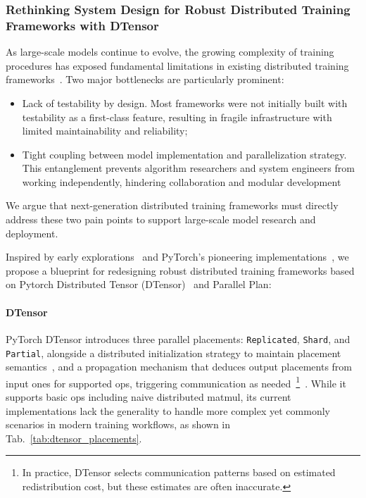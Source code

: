 
\subsubsection{Rethinking System Design for Robust Distributed Training Frameworks with DTensor}\label{sec:train_infra_odin}

As large-scale models continue to evolve, the growing  complexity of training procedures has exposed fundamental limitations in existing distributed training frameworks~\citep{shoeybi2020megatronlm, rajbhandari2020zeromemoryoptimizationstraining}. Two major bottlenecks are particularly prominent:
\begin{itemize}
    \item Lack of testability by design. Most frameworks were not initially built with testability as a first-class feature, resulting in fragile infrastructure with limited maintainability and reliability;
    \item Tight coupling between model implementation and parallelization strategy. This entanglement prevents algorithm researchers and system engineers from working independently, hindering collaboration and modular development
\end{itemize}
We argue that next-generation distributed training frameworks must directly address these two pain points to support large-scale model research and deployment.

Inspired by early explorations~\citep{xu2021gspmdgeneralscalableparallelization, yuan2022oneflowredesigndistributeddeep} and PyTorch’s pioneering implementations~\citep{zhao2023pytorch, pytorchdtensor2024, liang2024torchtitanonestoppytorchnative}, we propose a blueprint for redesigning robust distributed training frameworks based on Pytorch Distributed Tensor (DTensor)~\citep{pytorchdtensor2024} and Parallel Plan:

\paragraph{DTensor} PyTorch DTensor introduces three parallel placements: \texttt{Replicated}, \texttt{Shard}, and \texttt{Partial}, alongside a distributed initialization strategy to maintain placement semantics~\citep{pytorch_offset_rngtracker_2025}, and a propagation mechanism that deduces output placements from input ones for supported ops, triggering communication as needed~\footnote{In practice, DTensor selects communication patterns based on estimated redistribution cost, but these estimates are often inaccurate.}~\citep{pytorch_sharding_prop_2025}. While it supports basic ops including naive distributed matmul, its current implementations lack the generality to handle more complex yet commonly scenarios in modern training workflows, as shown in Tab.~\ref{tab:dtensor_placements}.

